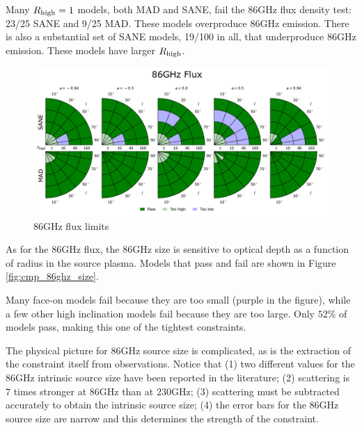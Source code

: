 Many $R_\mathrm{high} = 1$ models, both MAD and SANE, fail the $86$GHz flux density test: 23/25 SANE and 9/25 MAD.  These models overproduce $86$GHz emission.
There is also a substantial set of SANE models, 19/100 in all, that underproduce $86$GHz emission.  These models have larger $R_\mathrm{high}$.  

\begin{figure}
  \centering
  \includegraphics[width=\columnwidth]{./figures/86GHz_flux_Constraints.png}
  \caption{86GHz flux limits}
  \label{fig:cmp_86ghz_flux}
\end{figure}


As for the $86$GHz flux, the $86$GHz size is sensitive to optical depth as a function of radius in the source plasma. Models that pass and fail are shown in Figure \ref{fig:cmp_86ghz_size}.

Many face-on models fail because they are too small (purple in the figure), while a few other high inclination models fail because they are too large.  Only $52\%$ of models pass, making this one of the tightest constraints.

The physical picture for 86GHz source size is complicated, as is the extraction of the constraint itself from observations.  Notice that (1) two different values for the 86GHz intrinsic source size have been reported in the literature; (2) scattering is $7$ times stronger at $86$GHz than at $230$GHz; (3) scattering must be subtracted accurately to obtain the intrinsic source size; (4) the error bars for the 86GHz source size are narrow and this determines the strength of the constraint.

